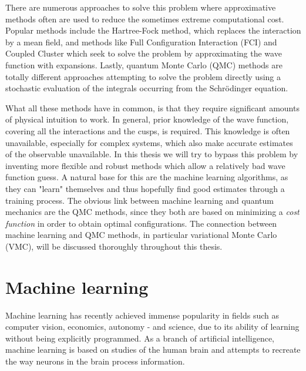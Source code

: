 There are numerous approaches to solve this problem where approximative methods often are used to reduce the sometimes extreme computational cost. Popular methods include the Hartree-Fock method, which replaces the interaction by a mean field, and methods like Full Configuration Interaction (FCI) and Coupled Cluster which seek to solve the problem by approximating the wave function with expansions. Lastly, quantum Monte Carlo (QMC) methods are totally different approaches attempting to solve the problem directly using a stochastic evaluation of the integrals occurring from the Schrödinger equation. 

What all these methods have in common, is that they require significant amounts of physical intuition to work. In general, prior knowledge of the wave function, covering all the interactions and the cusps, is required. This knowledge is often unavailable, especially for complex systems, which also make accurate estimates of the observable unavailable. In this thesis we will try to bypass this problem by inventing more flexible and robust methods which allow a relatively bad wave function guess. A natural base for this are the machine learning algorithms, as they can "learn" themselves and thus hopefully find good estimates through a training process. The obvious link between machine learning and quantum mechanics are the QMC methods, since they both are based on minimizing a \textit{cost function} in order to obtain optimal configurations. The connection between machine learning and QMC methods, in particular variational Monte Carlo (VMC), will be discussed thoroughly throughout this thesis.

\section{Machine learning} \label{sec:machinelearning}
Machine learning has recently achieved immense popularity in fields such as computer vision, economics, autonomy - and science, due to its ability of learning without being explicitly programmed. As a branch of artificial intelligence, machine learning is based on studies of the human brain and attempts to recreate the way neurons in the brain process information. 

